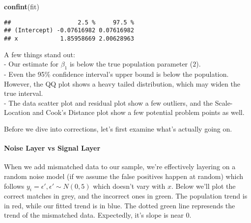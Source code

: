 \documentclass[
]{article}
\newenvironment{Shaded}{\begin{snugshade}}{\end{snugshade}}
\newcommand{\KeywordTok}[1]{\textcolor[rgb]{0.13,0.29,0.53}{\textbf{#1}}}
\newcommand{\NormalTok}[1]{#1}
\begin{document}
\begin{Shaded}
\begin{Highlighting}[]
\KeywordTok{confint}\NormalTok{(fit)}
\end{Highlighting}
\end{Shaded}

\begin{verbatim}
##                   2.5 %     97.5 %
## (Intercept) -0.07616982 0.07616982
## x            1.85958669 2.00628963
\end{verbatim}

A few things stand out:\\
- Our estimate for \(\beta_1\) is below the true population parameter
(\(2\)).\\
- Even the 95\% confidence interval's upper bound is below the
population. However, the QQ plot shows a heavy tailed distribution,
which may widen the true interval.\\
- The data scatter plot and residual plot show a few outliers, and the
Scale-Location and Cook's Distance plot show a few potential problem
points as well.

Before we dive into corrections, let's first examine what's actually
going on.

\hypertarget{noise-layer-vs-signal-layer}{%
\paragraph{Noise Layer vs Signal
Layer}\label{noise-layer-vs-signal-layer}}

When we add mismatched data to our sample, we're effectively layering on
a random noise model (if we assume the false positives happen at random)
which follows \(y_i = \epsilon', \epsilon'\sim N(0,5)\) which doesn't
vary with \(x\). Below we'll plot the correct matches in grey, and the
incorrect ones in green. The population trend is in red, while our
fitted trend is in blue. The dotted green line represends the trend of
the mismatched data. Expectedly, it's slope is near 0.
\end{document}
